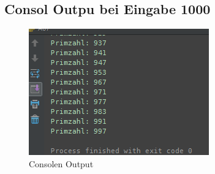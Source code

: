 \subsection{Consol Outpu bei Eingabe 1000}
\begin{figure}[!h]
	\begin{center}
		\includegraphics[width=0.7\linewidth]{images/consolOutput.png}
		\caption{Consolen Output}
		\label{broker}
	\end{center}
\end{figure}